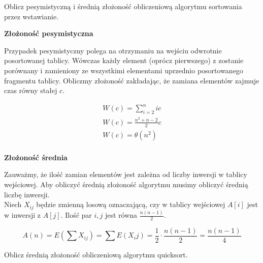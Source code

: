 \documentclass[main.tex]{subfiles}
\begin{document}
    \begin{exercise}
        Oblicz pesymistyczną i średnią złożoność obliczeniową algorytmu sortowania przez wstawianie.
    \end{exercise}

    \textbf{Złożoność pesymistyczna}

    Przypadek pesymistyczny polega na otrzymaniu na wejściu odwrotnie posortowanej tablicy.
    Wówczas każdy element (oprócz pierwszego) z zostanie porównany
    i zamieniony ze wszystkimi elementami uprzednio posortowanego fragmentu tablicy.
    Obliczmy złożoność zakładając, że zamiana elementów zajmuje czas równy stałej $c$.

    \begin{gather*}
        W(c) = \sum_{i = 2}^n ic\\
        W(c) = \frac{n^2 + n - 2}{2}c\\
        W(c) = \theta(n^2)\\
    \end{gather*}

    \textbf{Złożoność średnia}

    Zauważmy, że ilość zamian elementów jest zależna od liczby inwersji w tablicy wejściowej. Aby obliczyć średnią złożoność algorytmu musimy obliczyć średnią liczbę inwersji.\\

    Niech $X_{ij}$ będzie zmienną losową oznaczającą, czy w tablicy wejściowej $A[i]$ jest w inwersji z $A[j]$.
    Ilość par $i,j$ jest równa $\frac{n(n-1)}{2}.$

    \[A(n) = E\left(\sum X_{ij}\right) = \sum E(X_i j) = \frac{1}{2} \cdot \frac{n(n - 1)}{2} = \frac{n(n - 1)}{4}\]

    \begin{exercise}
        Oblicz średnią złożoność obliczeniową algorytmu quicksort.
    \end{exercise}
\end{document}
